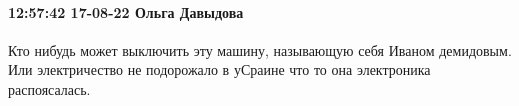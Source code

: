  
 
 
 
 

\paragraph{12:57:42 17-08-22 Ольга Давыдова}

Кто нибудь может выключить эту машину, называющую себя Иваном демидовым. Или
электричество не подорожало в уСраине что то она электроника распоясалась.
